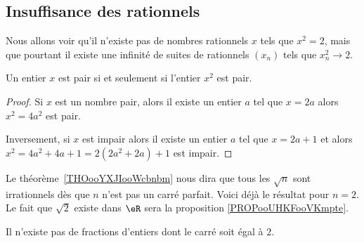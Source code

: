 \subsection{Insuffisance des rationnels}

Nous allons voir qu'il n'existe pas de nombres rationnels \( x\) tels que \( x^2=2\), mais que pourtant il existe une infinité de suites de rationnels \( (x_n)\) tels que \(  x_n^2\to 2  \).

\begin{lemma}       \label{LemJPIUooWFHaFM}
    Un entier \( x\) est pair si et seulement si l'entier \( x^2\) est pair.
\end{lemma}

\begin{proof}
    Si \( x\) est un nombre pair, alors il existe un entier \( a\) tel que \( x=2a\) alors \( x^2=4a^2\) est pair.

    Inversement, si \( x\) est impair alors il existe un entier \( a\) tel que \( x=2a+1\) et alors \( x^2=4a^2+4a+1=2(2a^2+2a)+1\) est impair.
\end{proof}

Le théorème~\ref{THOooYXJIooWcbnbm} nous dira que tous les \( \sqrt{n}\) sont irrationnels dès que \( n\) n'est pas un carré parfait. Voici déjà le résultat pour \( n=2\). Le fait que \( \sqrt{ 2 }\) existe dans \( \eR\) sera la proposition \ref{PROPooUHKFooVKmpte}.
\begin{proposition}     \label{PropooRJMSooPrdeJb}
    Il n'existe pas de fractions d'entiers dont le carré soit égal à \( 2\).
\end{proposition}

